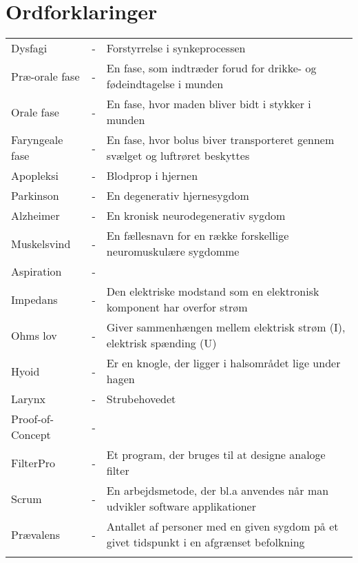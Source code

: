 
\chapter{Ordforklaringer}

\begin{table}[H]
\center
{}
\begin{tabularx}{\linewidth}{l l X}	
Dysfagi			& - & Forstyrrelse i synkeprocessen  \\ \addlinespace[2mm]
Præ-orale fase	& - & En fase, som indtræder forud for drikke- og fødeindtagelse i munden  \\ \addlinespace[2mm]
Orale fase		& - & En fase, hvor maden bliver bidt i stykker i munden  \\ \addlinespace[2mm]
Faryngeale fase	& - & En fase, hvor bolus biver transporteret gennem svælget og luftrøret beskyttes   \\ \addlinespace[2mm]
Apopleksi & - &    Blodprop i hjernen \\ \addlinespace[2mm]
Parkinson  & - & En degenerativ hjernesygdom \\ 
\addlinespace[2mm]
Alzheimer & - & En kronisk neurodegenerativ sygdom  \\ \addlinespace[2mm]
Muskelsvind& - &   En fællesnavn for en række forskellige neuromuskulære sygdomme\\ \addlinespace[2mm]
Aspiration & - &   \\ \addlinespace[2mm]
Impedans & - &  Den elektriske modstand som en elektronisk komponent har overfor strøm \\ \addlinespace[2mm]
Ohms lov& - &   Giver sammenhængen mellem elektrisk strøm (I), elektrisk spænding (U)\\ \addlinespace[2mm]
Hyoid& - &  Er en knogle, der ligger i halsområdet lige under hagen \\ \addlinespace[2mm]
Larynx& - & Strubehovedet   \\ \addlinespace[2mm]
Proof-of-Concept& - &   \\ \addlinespace[2mm]

FilterPro  		& - & Et program, der bruges til at designe analoge filter  \\ \addlinespace[2mm]
Scrum 			& - &  En arbejdsmetode, der bl.a anvendes når man udvikler software applikationer \\ \addlinespace[2mm]

Prævalens 			& - &  Antallet af personer med en given sygdom på et givet tidspunkt i en afgrænset befolkning \\ \addlinespace[2mm]


\end{tabularx}
\end{table}
